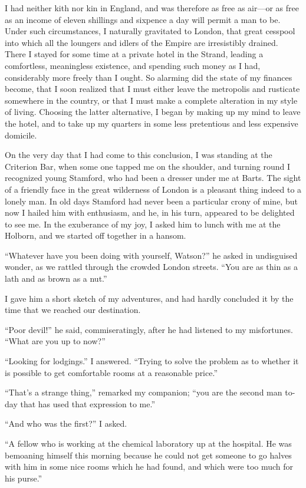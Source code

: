 \documentclass[12pt]{book}
\begin{document}
I had neither kith nor kin in England, and was therefore as free as air—or as free as an income of eleven shillings and sixpence a day will permit a man to be. Under such circumstances, I naturally gravitated to London, that great cesspool into which all the loungers and idlers of the Empire are irresistibly drained. There I stayed for some time at a private hotel in the Strand, leading a comfortless, meaningless existence, and spending such money as I had, considerably more freely than I ought. So alarming did the state of my finances become, that I soon realized that I must either leave the metropolis and rusticate somewhere in the country, or that I must make a complete alteration in my style of living. Choosing the latter alternative, I began by making up my mind to leave the hotel, and to take up my quarters in some less pretentious and less expensive domicile. 

On the very day that I had come to this conclusion, I was standing at the Criterion Bar, when some one tapped me on the shoulder, and turning round I recognized young Stamford, who had been a dresser under me at Barts. The sight of a friendly face in the great wilderness of London is a pleasant thing indeed to a lonely man. In old days Stamford had never been a particular crony of mine, but now I hailed him with enthusiasm, and he, in his turn, appeared to be delighted to see me. In the exuberance of my joy, I asked him to lunch with me at the Holborn, and we started off together in a hansom. 

“Whatever have you been doing with yourself, Watson?” he asked in undisguised wonder, as we rattled through the crowded London streets. “You are as thin as a lath and as brown as a nut.” 

I gave him a short sketch of my adventures, and had hardly concluded it by the time that we reached our destination. 

“Poor devil!” he said, commiseratingly, after he had listened to my misfortunes. “What are you up to now?” 

“Looking for lodgings.” I answered. “Trying to solve the problem as to whether it is possible to get comfortable rooms at a reasonable price.” 

“That’s a strange thing,” remarked my companion; “you are the second man to-day that has used that expression to me.” 

“And who was the first?” I asked. 

“A fellow who is working at the chemical laboratory up at the hospital. He was bemoaning himself this morning because he could not get someone to go halves with him in some nice rooms which he had found, and which were too much for his purse.” 
\end{document}
